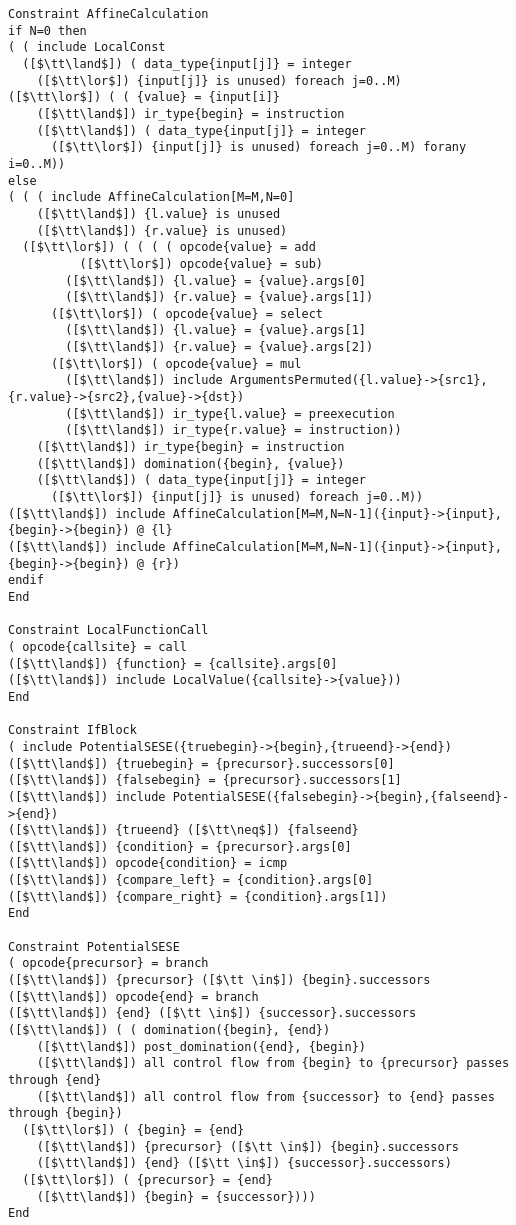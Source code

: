 \begin{lstlisting}[language=CAnDL]
Constraint AffineCalculation
if N=0 then
( ( include LocalConst
  ([$\tt\land$]) ( data_type{input[j]} = integer
    ([$\tt\lor$]) {input[j]} is unused) foreach j=0..M)
([$\tt\lor$]) ( ( {value} = {input[i]}
    ([$\tt\land$]) ir_type{begin} = instruction
    ([$\tt\land$]) ( data_type{input[j]} = integer
      ([$\tt\lor$]) {input[j]} is unused) foreach j=0..M) forany i=0..M))
else
( ( ( include AffineCalculation[M=M,N=0]
    ([$\tt\land$]) {l.value} is unused
    ([$\tt\land$]) {r.value} is unused)
  ([$\tt\lor$]) ( ( ( ( opcode{value} = add
          ([$\tt\lor$]) opcode{value} = sub)
        ([$\tt\land$]) {l.value} = {value}.args[0]
        ([$\tt\land$]) {r.value} = {value}.args[1])
      ([$\tt\lor$]) ( opcode{value} = select
        ([$\tt\land$]) {l.value} = {value}.args[1]
        ([$\tt\land$]) {r.value} = {value}.args[2])
      ([$\tt\lor$]) ( opcode{value} = mul
        ([$\tt\land$]) include ArgumentsPermuted({l.value}->{src1},{r.value}->{src2},{value}->{dst})
        ([$\tt\land$]) ir_type{l.value} = preexecution
        ([$\tt\land$]) ir_type{r.value} = instruction))
    ([$\tt\land$]) ir_type{begin} = instruction
    ([$\tt\land$]) domination({begin}, {value})
    ([$\tt\land$]) ( data_type{input[j]} = integer
      ([$\tt\lor$]) {input[j]} is unused) foreach j=0..M))
([$\tt\land$]) include AffineCalculation[M=M,N=N-1]({input}->{input},{begin}->{begin}) @ {l}
([$\tt\land$]) include AffineCalculation[M=M,N=N-1]({input}->{input},{begin}->{begin}) @ {r})
endif
End

Constraint LocalFunctionCall
( opcode{callsite} = call
([$\tt\land$]) {function} = {callsite}.args[0]
([$\tt\land$]) include LocalValue({callsite}->{value}))
End

Constraint IfBlock
( include PotentialSESE({truebegin}->{begin},{trueend}->{end})
([$\tt\land$]) {truebegin} = {precursor}.successors[0]
([$\tt\land$]) {falsebegin} = {precursor}.successors[1]
([$\tt\land$]) include PotentialSESE({falsebegin}->{begin},{falseend}->{end})
([$\tt\land$]) {trueend} ([$\tt\neq$]) {falseend}
([$\tt\land$]) {condition} = {precursor}.args[0]
([$\tt\land$]) opcode{condition} = icmp
([$\tt\land$]) {compare_left} = {condition}.args[0]
([$\tt\land$]) {compare_right} = {condition}.args[1])
End

Constraint PotentialSESE
( opcode{precursor} = branch
([$\tt\land$]) {precursor} ([$\tt \in$]) {begin}.successors
([$\tt\land$]) opcode{end} = branch
([$\tt\land$]) {end} ([$\tt \in$]) {successor}.successors
([$\tt\land$]) ( ( domination({begin}, {end})
    ([$\tt\land$]) post_domination({end}, {begin})
    ([$\tt\land$]) all control flow from {begin} to {precursor} passes through {end}
    ([$\tt\land$]) all control flow from {successor} to {end} passes through {begin})
  ([$\tt\lor$]) ( {begin} = {end}
    ([$\tt\land$]) {precursor} ([$\tt \in$]) {begin}.successors
    ([$\tt\land$]) {end} ([$\tt \in$]) {successor}.successors)
  ([$\tt\lor$]) ( {precursor} = {end}
    ([$\tt\land$]) {begin} = {successor})))
End


\end{lstlisting}
